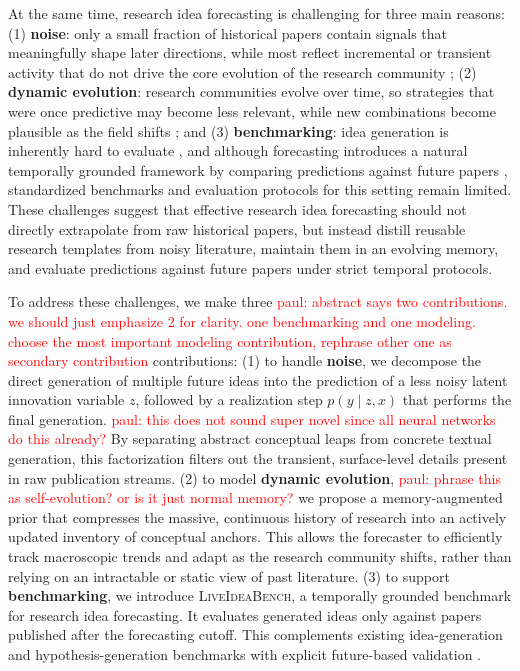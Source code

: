 \documentclass{article} %
\newcommand{\paul}[1]{\textcolor{red}{paul: #1}}
\begin{document}
At the same time, research idea forecasting is challenging for three main reasons: (1) \textbf{noise}: only a small fraction of historical papers contain signals that meaningfully shape later directions, while most reflect incremental or transient activity that do not drive the core evolution of the research community \citep{wang2013impact,li2024scilitllm}; (2) \textbf{dynamic evolution}: research communities evolve over time, so strategies that were once predictive may become less relevant, while new combinations become plausible as the field shifts \citep{blei2006dynamic,yu2024researchtown}; and (3) \textbf{benchmarking}: idea generation is inherently hard to evaluate \citep{si2025novel,guo2024ideabench,liu2025hypobench}, and although forecasting introduces a natural temporally grounded framework by comparing predictions against future papers \citep{karger2024forecastbench,wen2025predicting}, standardized benchmarks and evaluation protocols for this setting remain limited. These challenges suggest that effective research idea forecasting should not directly extrapolate from raw historical papers, but instead distill reusable research templates from noisy literature, maintain them in an evolving memory, and evaluate predictions against future papers under strict temporal protocols.

To address these challenges, we make three \paul{abstract says two contributions. we should just emphasize 2 for clarity. one benchmarking and one modeling. choose the most important modeling contribution, rephrase other one as secondary contribution} contributions: (1) to handle \textbf{noise}, we decompose the direct generation of multiple future ideas into the prediction of a less noisy latent innovation variable $z$, followed by a realization step $p(y \mid z, x)$ that performs the final generation. \paul{this does not sound super novel since all neural networks do this already?} By separating abstract conceptual leaps from concrete textual generation, this factorization filters out the transient, surface-level details present in raw publication streams. (2) to model \textbf{dynamic evolution}, \paul{phrase this as self-evolution? or is it just normal memory?} we propose a memory-augmented prior that compresses the massive, continuous history of research into an actively updated inventory of conceptual anchors. This allows the forecaster to efficiently track macroscopic trends and adapt as the research community shifts, rather than relying on an intractable or static view of past literature. (3) to support \textbf{benchmarking}, we introduce \textsc{LiveIdeaBench}, a temporally grounded benchmark for research idea forecasting. It evaluates generated ideas only against papers published after the forecasting cutoff. This complements existing idea-generation and hypothesis-generation benchmarks with explicit future-based validation \citep{si2025novel,guo2024ideabench,liu2025hypobench,karger2024forecastbench,wen2025predicting}.
\end{document}
